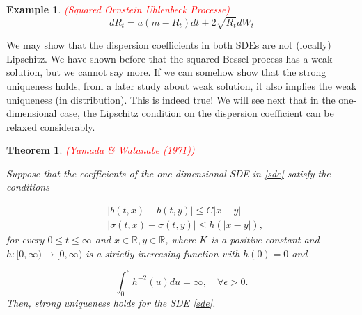 \documentclass{article}
\newtheorem{theorem}{Theorem}
\newtheorem{ex}{Example}
\begin{document}
\begin{ex} \textcolor{red}{(Squared Ornstein Uhlenbeck Processe)}
\begin{equation*}
dR_t=a(m-R_t)dt+2\sqrt{R_t}dW_t
\end{equation*}
\end{ex}

We may show that the dispersion coefficients in both SDEs are not (locally) Lipschitz. We have shown before that the squared-Bessel process has a weak solution, but we cannot say more. If we can somehow show that the strong uniqueness holds, from a later study about weak solution, it also implies the weak uniqueness (in distribution). This is indeed true! We will see next that in the one-dimensional case, the Lipschitz condition on the dispersion coefficient can be relaxed considerably. 

\begin{theorem} \label{thm:yamada_watanabe_uniqueness} \textcolor{red}{(Yamada \& Watanabe (1971))}

Suppose that the coefficients of the one dimensional SDE in \eqref{sde} satisfy the conditions

\begin{equation}
\begin{aligned}
&|b(t,x)-b(t,y)|\leq C|x-y|\\
&|\sigma(t,x)-\sigma(t,y)|\leq h(|x-y|),
\end{aligned}
\end{equation}
for every $0\leq t\leq \infty$ and $x\in\mathbb{R},y\in\mathbb{R}$, where $K$ is a positive constant and $h:[0,\infty)\rightarrow[0,\infty)$ is a strictly increasing function with $h(0)=0$ and 

\begin{equation} \label{yamada_watanabe_h}
\int_0^\epsilon h^{-2}(u)du=\infty, \quad \forall\epsilon>0.
\end{equation}
Then, strong uniqueness holds for the SDE \eqref{sde}.
\end{theorem}
\end{document}
